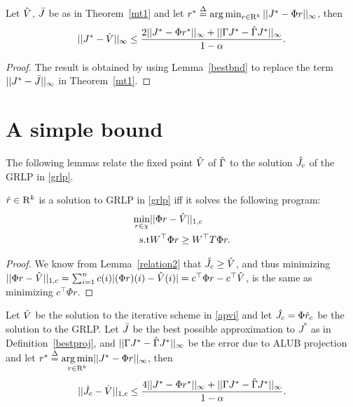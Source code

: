 \documentclass[12pt,draftcls,onecolumn]{IEEEtran}
\begin{document}
\begin{corollary}\label{cmt1}
Let $\hat{V}$, $\bar{J}$ be as in Theorem~\ref{mt1} and let $r^*\stackrel{\Delta}{=}\arg\min_{r\in \mathrm{R}^k}||J^*-\Phi r||_\infty$, then
\begin{align}
||J^*-\hat{V}||_\infty\leq \frac{2||J^*-\Phi r^*||_\infty+||\Gamma J^*-\hat{\Gamma} J^*||_\infty}{1-\alpha}.
\end{align}
\end{corollary}
\begin{proof}
The result is obtained by using Lemma~\ref{bestbnd} to replace the term $||J^*-\bar{J}||_\infty$ in Theorem~\ref{mt1}.
\end{proof}

\section{A simple bound}
The following lemmas relate the fixed point $\hat{V}$ of $\hat{\Gamma}$ to the solution $\hat{J}_c$ of the GRLP in \eqref{grlp}.
\begin{lemma}\label{srw}
$\hat{r} \in \mathrm{R}^k$ is a solution to GRLP in \eqref{grlp} iff it solves the following program:
\begin{align}\label{grlpeqprog}
\min_{r\in \chi} &||\Phi r-\hv||_{1,c}\nn\\
\text{s.t}\mb & W^\top \Phi r\geq W^\top T \Phi r.
\end{align}
\end{lemma}
\begin{proof}
We know from Lemma~\ref{relation2} that $\hat{J}_c\geq\hat{V}$, and thus minimizing $||\Phi r-\hat{V}||_{1,c}=\sum_{i=1}^n c(i) |(\Phi r)(i)-\hat{V}(i)|=c^\top \Phi r-c^\top \hat{V}$, is the same as minimizing $c^\top \Phi r$.
\end{proof}
\begin{theorem}\label{mt2}
Let $\hat{V}$ be the solution to the iterative scheme in \eqref{apvi} and let $\hat{J}_c=\Phi \hat{r}_c$ be the solution to the GRLP. Let $\bar{J}$ be the best possible approximation to $J^*$ as in Definition~\ref{bestproj}, and $||\Gamma J^* -\hat{\Gamma} J^*||_\infty$ be the error due to ALUB projection and let $r^*\stackrel{\Delta}{=}\underset{r\in \mathrm{R}^k}{\arg\min}||J^*-\Phi r||_\infty$, then
\begin{align}
||\hat{J}_c-\hat{V}||_{1,c}\leq\frac{4||J^*-\Phi r^*||_\infty+||\Gamma J^*-\hat{\Gamma} J^*||_\infty}{1-\alpha}.
\end{align}
\end{theorem}
\end{document}

